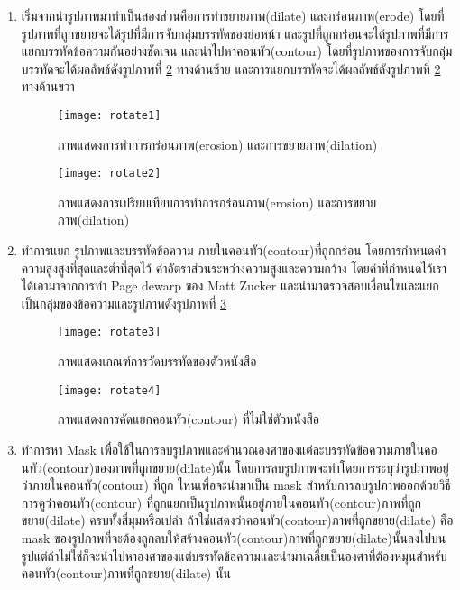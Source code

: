 \begin{enumerate}
    \item เริ่มจากนำรูปภาพมาทำเป็นสองส่วนคือการทำขยายภาพ(dilate) และกร่อนภาพ(erode) โดยที่รูปภาพที่ถูกขยายจะได้รูปที่มีการจับกลุ่มบรรทัดของย่อหน้า และรูปที่ถูกกร่อนจะได้รูปภาพที่มีการแยกบรรทัดข้อความกันอย่างชัดเจน และนำไปหาคอนทัว(contour) โดยที่รูปภาพของการจับกลุ่มบรรทัดจะได้ผลลัพธ์ดังรูปภาพที่ \ref{fig:rotate2} ทางด้านซ้าย และการแยกบรรทัดจะได้ผลลัพธ์ดังรูปภาพที่ \ref{fig:rotate2} ทางด้านขวา 
    
    \begin{figure}[H]
        \centering
        \texttt{[image: rotate1]}
        \caption{ภาพแสดงการทำการกร่อนภาพ(erosion) และการขยายภาพ(dilation)}\label{fig:rotate1}
    \end{figure}
    
    \begin{figure}[H]
        \centering
        \texttt{[image: rotate2]}
        \caption{ภาพแสดงการเปรียบเทียบการทำการกร่อนภาพ(erosion) และการขยายภาพ(dilation)}\label{fig:rotate2}
    \end{figure}

    \item ทำการแยก รูปภาพและบรรทัดข้อความ ภายในคอนทัว(contour)ที่ถูกกร่อน โดยการกำหนดค่าความสูงสูงที่สุดและต่ำที่สุดไว้ ค่าอัตราส่วนระหว่างความสูงและความกว้าง โดยค่าที่กำหนดไว้เราได้เอามาจากการทำ Page dewarp ของ Matt Zucker \cite{mattzuck} และนำมาตรวจสอบเงื่อนไขและแยกเป็นกลุ่มของข้อความและรูปภาพดังรูปภาพที่ \ref{fig:rotate3}
    
    \begin{figure}[H]
        \centering
        \texttt{[image: rotate3]}
        \caption{ภาพแสดงเกณฑ์การวัดบรรทัดของตัวหนังสือ}\label{fig:rotate3}
    \end{figure}
    
    \begin{figure}[H]
        \centering
        \texttt{[image: rotate4]}
        \caption{ภาพแสดงการคัดแยกคอนทัว(contour) ที่ไม่ใช่ตัวหนังสือ}\label{fig:rotate4}
    \end{figure}

    \item ทำการหา Mask เพื่อใช้ในการลบรูปภาพและคำนวณองศาของแต่ละบรรทัดข้อความภายในคอนทัว(contour)ของภาพที่ถูกขยาย(dilate)นั้น โดยการลบรูปภาพจะทำโดยการระบุว่ารูปภาพอยู่ว่าภายในคอนทัว(contour) ที่ถูก ไหนเพื่อจะนำมาเป็น mask สำหรับการลบรูปภาพออกด้วยวิธีการดูว่าคอนทัว(contour) ที่ถูกแยกเป็นรูปภาพนั้นอยู่ภายในคอนทัว(contour)ภาพที่ถูกขยาย(dilate) ครบทั้งสี่มุมหรือเปล่า ถ้าใช่แสดงว่าคอนทัว(contour)ภาพที่ถูกขยาย(dilate) คือ mask ของรูปภาพที่จะต้องถูกลบให้สร้างคอนทัว(contour)ภาพที่ถูกขยาย(dilate)นั้นลงไปบนรูปแต่ถ้าไม่ใช่ก็จะนำไปหาองศาของแต่บรรทัดข้อความและนำมาเฉลี่ยเป็นองศาที่ต้องหมุนสำหรับคอนทัว(contour)ภาพที่ถูกขยาย(dilate) นั้น
    

\end{enumerate}
